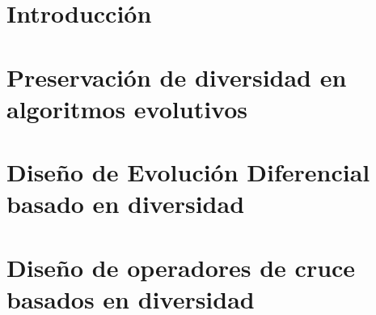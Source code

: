 \documentclass[review,3p]{elsarticle}
\begin{document}

\section{Introducción}
\label{sec:Introduction}


\section{Preservación de diversidad en algoritmos evolutivos}
\label{sec:Mecanismos}


\section{Diseño de Evolución Diferencial basado en diversidad}
\label{sec:ED}


\section{Diseño de operadores de cruce basados en diversidad}
\label{sec:Operadores}

%
%



\end{document}
